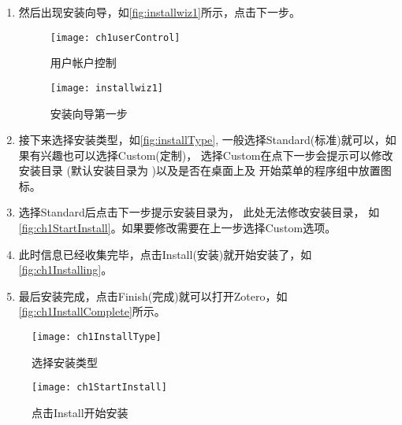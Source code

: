 \documentclass[cn,11pt,chinese]{elegantbook}
\begin{document}
\begin{enumerate}
			\item 然后出现安装向导，如\autoref{fig:installwiz1}所示，点击下一步。
				\begin{figure}[htbp]
					\centering
					\begin{minipage}[t]{\dimexpr0.5\textwidth-4em}
						\centering
						\texttt{[image: ch1userControl]}
						\caption{用户帐户控制}
						\label{fig:userControl}
					\end{minipage}
					\hspace{1em}		
					\begin{minipage}[t]{\dimexpr0.5\textwidth-4em}
						\centering
						\texttt{[image: installwiz1]}
						\caption{安装向导第一步}
						\label{fig:installwiz1}
					\end{minipage}
				\end{figure}
			\item 接下来选择安装类型，如\autoref{fig:installType},
			一般选择Standard(标准)就可以，如果有兴趣也可以选择Custom(定制)，
			选择Custom在点下一步会提示可以修改安装目录
			(默认安装目录为 )以及是否在桌面上及
			开始菜单的程序组中放置图标。
			\item 选择Standard后点击下一步提示安装目录为，
			此处无法修改安装目录，
			如\autoref{fig:ch1StartInstall}。如果要修改需要在上一步选择Custom选项。
			\item 此时信息已经收集完毕，点击Install(安装)就开始安装了，如\autoref{fig:ch1Installing}。
			\item 最后安装完成，点击Finish(完成)就可以打开Zotero，如\autoref{fig:ch1InstallComplete}所示。
	\end{enumerate}
		
			\begin{figure}[htbp]
				
				\begin{minipage}[t]{\dimexpr0.5\textwidth-4em}
					\centering
					\texttt{[image: ch1InstallType]}
					\caption{选择安装类型}
					\label{fig:installType}
				\end{minipage}
				\hspace{1cm}	
				\begin{minipage}[t]{\dimexpr0.5\textwidth-4em}
					\centering
					\texttt{[image: ch1StartInstall]}
					\caption{点击Install开始安装}
					\label{fig:ch1StartInstall}
				\end{minipage}
				
			\end{figure}	
		
\end{document}
